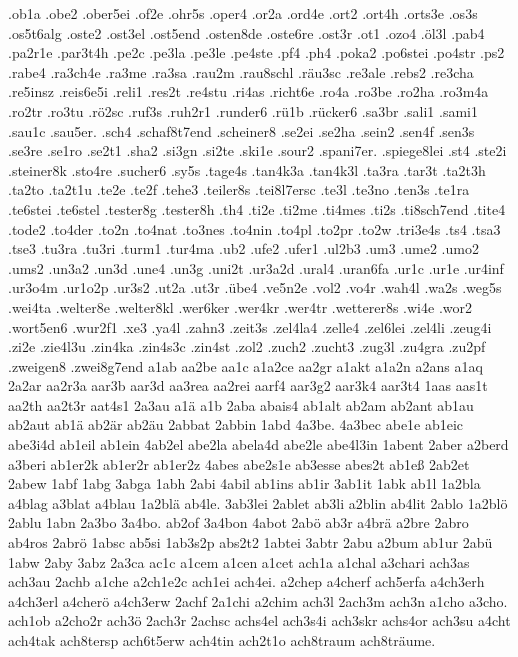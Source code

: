 {.ob1a
.obe2
.ober5ei
.of2e
.ohr5s
.oper4
.or2a
.ord4e
.ort2
.ort4h
.orts3e
.os3s
.os5t6alg
.oste2
.ost3el
.ost5end
.osten8de
.oste6re
.ost3r
.ot1
.ozo4
.öl3l
.pab4
.pa2r1e
.par3t4h
.pe2c
.pe3la
.pe3le
.pe4ste
.pf4
.ph4
.poka2
.po6stei
.po4str
.ps2
.rabe4
.ra3ch4e
.ra3me
.ra3sa
.rau2m
.rau8schl
.räu3sc
.re3ale
.rebs2
.re3cha
.re5insz
.reis6e5i
.reli1
.res2t
.re4stu
.ri4as
.richt6e
.ro4a
.ro3be
.ro2ha
.ro3m4a
.ro2tr
.ro3tu
.rö2sc
.ruf3s
.ruh2r1
.runder6
.rü1b
.rücker6
.sa3br
.sali1
.sami1
.sau1c
.sau5er.
.sch4
.schaf8t7end
.scheiner8
.se2ei
.se2ha
.sein2
.sen4f
.sen3s
.se3re
.se1ro
.se2t1
.sha2
.si3gn
.si2te
.ski1e
.sour2
.spani7er.
.spiege8lei
.st4
.ste2i
.steiner8k
.sto4re
.sucher6
.sy5s
.tage4s
.tan4k3a
.tan4k3l
.ta3ra
.tar3t
.ta2t3h
.ta2to
.ta2t1u
.te2e
.te2f
.tehe3
.teiler8s
.tei8l7ersc
.te3l
.te3no
.ten3s
.te1ra
.te6stei
.te6stel
.tester8g
.tester8h
.th4
.ti2e
.ti2me
.ti4mes
.ti2s
.ti8sch7end
.tite4
.tode2
.to4der
.to2n
.to4nat
.to3nes
.to4nin
.to4pl
.to2pr
.to2w
.tri3e4s
.ts4
.tsa3
.tse3
.tu3ra
.tu3ri
.turm1
.tur4ma
.ub2
.ufe2
.ufer1
.ul2b3
.um3
.ume2
.umo2
.ums2
.un3a2
.un3d
.une4
.un3g
.uni2t
.ur3a2d
.ural4
.uran6fa
.ur1c
.ur1e
.ur4inf
.ur3o4m
.ur1o2p
.ur3s2
.ut2a
.ut3r
.übe4
.ve5n2e
.vol2
.vo4r
.wah4l
.wa2s
.weg5s
.wei4ta
.welter8e
.welter8kl
.wer6ker
.wer4kr
.wer4tr
.wetterer8s
.wi4e
.wor2
.wort5en6
.wur2f1
.xe3
.ya4l
.zahn3
.zeit3s
.zel4la4
.zelle4
.zel6lei
.zel4li
.zeug4i
.zi2e
.zie4l3u
.zin4ka
.zin4s3c
.zin4st
.zol2
.zuch2
.zucht3
.zug3l
.zu4gra
.zu2pf
.zweigen8
.zwei8g7end
a1ab
aa2be
aa1c
a1a2ce
aa2gr
a1akt
a1a2n
a2ans
a1aq
2a2ar
aa2r3a
aar3b
aar3d
aa3rea
aa2rei
aarf4
aar3g2
aar3k4
aar3t4
1aas
aas1t
aa2th
aa2t3r
aat4s1
2a3au
a1ä
a1b
2aba
abais4
ab1alt
ab2am
ab2ant
ab1au
ab2aut
ab1ä
ab2är
ab2äu
2abbat
2abbin
1abd
4a3be.
4a3bec
abe1e
ab1eic
abe3i4d
ab1eil
ab1ein
4ab2el
abe2la
abela4d
abe2le
abe4l3in
1abent
2aber
a2berd
a3beri
ab1er2k
ab1er2r
ab1er2z
4abes
abe2s1e
ab3esse
abes2t
ab1eß
2ab2et
2abew
1abf
1abg
3abga
1abh
2abi
4abil
ab1ins
ab1ir
3ab1it
1abk
ab1l
1a2bla
a4blag
a3blat
a4blau
1a2blä
ab4le.
3ab3lei
2ablet
ab3li
a2blin
ab4lit
2ablo
1a2blö
2ablu
1abn
2a3bo
3a4bo.
ab2of
3a4bon
4abot
2abö
ab3r
a4brä
a2bre
2abro
ab4ros
2abrö
1absc
ab5si
1ab3s2p
abs2t2
1abtei
3abtr
2abu
a2bum
ab1ur
2abü
1abw
2aby
3abz
2a3ca
ac1c
a1cem
a1cen
a1cet
ach1a
a1chal
a3chari
ach3as
ach3au
2achb
a1che
a2ch1e2c
ach1ei
ach4ei.
a2chep
a4cherf
ach5erfa
a4ch3erh
a4ch3erl
a4cherö
a4ch3erw
2achf
2a1chi
a2chim
ach3l
2ach3m
ach3n
a1cho
a3cho.
ach1ob
a2cho2r
ach3ö
2ach3r
2achsc
achs4el
ach3s4i
ach3skr
achs4or
ach3su
a4cht
ach4tak
ach8tersp
ach6t5erw
ach4tin
ach2t1o
ach8traum
ach8träume.
}
